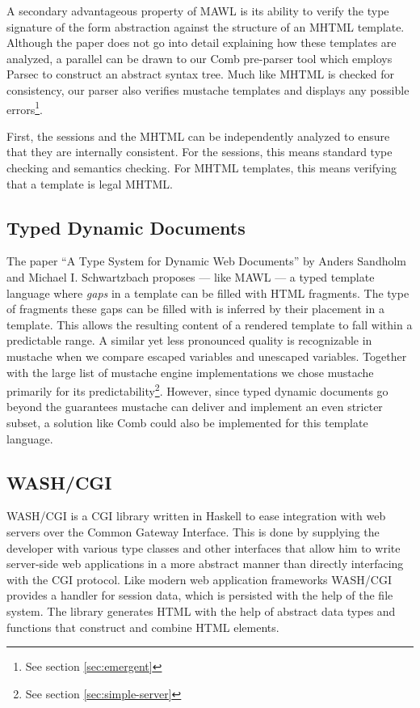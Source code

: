 \documentclass[thesis.tex]{subfiles}
\begin{document}
A secondary advantageous property of MAWL is its ability to verify the
type signature of the form abstraction against the structure of
an MHTML template.
Although the paper does not go into detail explaining how these templates are
analyzed, a parallel can be drawn to our Comb pre-parser tool which employs
Parsec to construct an abstract syntax tree. Much like MHTML is checked for
consistency, our parser also verifies mustache templates and displays any
possible errors\footnote{See section \ref{sec:emergent}}.
\begin{citequote}{\cite{MAWL}}
First, the sessions and the MHTML can be independently analyzed to ensure that
they are internally consistent.
For the sessions, this means standard type checking and semantics checking.
For MHTML templates, this means verifying that a template is legal MHTML.
\end{citequote}

\subsection{Typed Dynamic Documents}
The paper ``A Type System for Dynamic Web Documents'' by Anders Sandholm and
Michael I. Schwartzbach proposes --- like MAWL --- a typed template language
where \emph{gaps} in a template can be filled with HTML fragments.
The type of fragments these gaps can be filled with is inferred by their
placement in a template.
This allows the resulting content of a rendered template to fall
within a predictable range.
A similar yet less pronounced quality is recognizable in mustache when we
compare escaped variables and unescaped variables.
Together with the large list of mustache engine implementations we chose
mustache primarily for its
predictability\footnote{See section \ref{sec:simple-server}}.
However, since typed dynamic documents go beyond the guarantees mustache can
deliver and implement an even stricter subset, a solution like Comb could also
be implemented for this template language.

\subsection{WASH/CGI}
WASH/CGI \cite{WASH} is a CGI library written in Haskell to ease integration
with web servers over the Common Gateway Interface. This is done by supplying
the developer with various type classes and other interfaces that allow him to
write server-side web applications in a more abstract manner than directly
interfacing with the CGI protocol. Like modern web application frameworks
WASH/CGI provides a handler for session data, which is persisted with the help
of the file system.
The library generates HTML with the help of abstract data types and functions
that construct and combine HTML elements.
\end{document}

